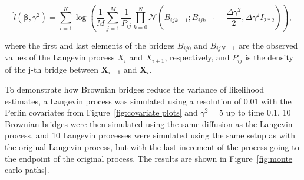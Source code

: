 $$
\hat{l}(\bm \beta, \gamma^2) = \sum_{i = 1}^K \log( \frac{1}{M}\sum_{j=1}^M \frac{1}{P_{ij}}\prod_{k=0}^N \mathcal{N}(B_{ijk+1} ; B_{ijk+1} - \frac{\Delta \gamma^2}{2}, \Delta\gamma^2 I_{2*2})),
$$

where the first and last elements of the bridges $B_{ij0}$ and $B_{ijN+1}$ are the observed values of the Langevin process $X_i$ and $X_{i+1}$, respectively, and $P_{ij}$ is the density of the j-th bridge between $\textbf{X}_{i+1}$ and $\textbf{X}_i$.


To demonstrate how Brownian bridges reduce the variance of likelihood estimates, a Langevin process was simulated using a resolution of $0.01$ with the Perlin covariates from Figure~\ref{fig:covariate plots} and $\gamma^2 = 5$ up to time $0.1$. 10 Brownian bridges were then simulated using the same diffusion as the Langevin process, and 10 Langevin processes were simulated using the same setup as with the original Langevin process, but with the last increment of the process going to the endpoint of the original process. The results are shown in Figure~\ref{fig:monte carlo paths}. 


